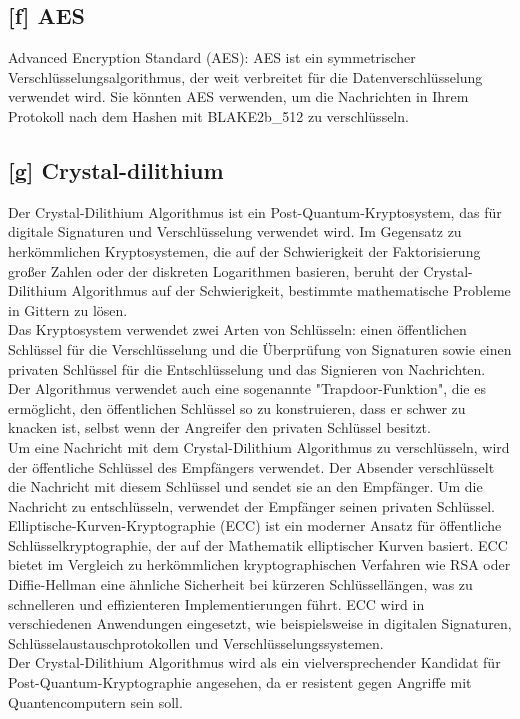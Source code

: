 \subsection*{[f] AES}
\label{glo:aes}
Advanced Encryption Standard (AES): AES ist ein symmetrischer Verschlüsselungsalgorithmus, der weit verbreitet für die Datenverschlüsselung verwendet wird. Sie könnten AES verwenden, um die Nachrichten in Ihrem Protokoll nach dem Hashen mit BLAKE2b\_512 zu verschlüsseln.
\subsection*{[g] Crystal-dilithium}
\label{glo:crystal-dilithium}
Der Crystal-Dilithium \cite{crystal} Algorithmus ist ein Post-Quantum-Kryptosystem, das für digitale Signaturen und Verschlüsselung verwendet wird. Im Gegensatz zu herkömmlichen Kryptosystemen, die auf der Schwierigkeit der Faktorisierung großer Zahlen oder der diskreten Logarithmen basieren, beruht der Crystal-Dilithium Algorithmus auf der Schwierigkeit, bestimmte mathematische Probleme in Gittern zu lösen.\\
Das Kryptosystem verwendet zwei Arten von Schlüsseln: einen öffentlichen Schlüssel für die Verschlüsselung und die Überprüfung von Signaturen sowie einen privaten Schlüssel für die Entschlüsselung und das Signieren von Nachrichten. Der Algorithmus verwendet auch eine sogenannte "Trapdoor-Funktion", die es ermöglicht, den öffentlichen Schlüssel so zu konstruieren, dass er schwer zu knacken ist, selbst wenn der Angreifer den privaten Schlüssel besitzt.\\
Um eine Nachricht mit dem Crystal-Dilithium Algorithmus zu verschlüsseln, wird der öffentliche Schlüssel des Empfängers verwendet. Der Absender verschlüsselt die Nachricht mit diesem Schlüssel und sendet sie an den Empfänger. Um die Nachricht zu entschlüsseln, verwendet der Empfänger seinen privaten Schlüssel.\\
Elliptische-Kurven-Kryptographie (ECC) ist ein moderner Ansatz für öffentliche Schlüsselkryptographie, der auf der Mathematik elliptischer Kurven basiert. ECC bietet im Vergleich zu herkömmlichen kryptographischen Verfahren wie RSA oder Diffie-Hellman eine ähnliche Sicherheit bei kürzeren Schlüssellängen, was zu schnelleren und effizienteren Implementierungen führt. ECC wird in verschiedenen Anwendungen eingesetzt, wie beispielsweise in digitalen Signaturen, Schlüsselaustauschprotokollen und Verschlüsselungssystemen.\\
Der Crystal-Dilithium Algorithmus wird als ein vielversprechender Kandidat für Post-Quantum-Kryptographie angesehen, da er resistent gegen Angriffe mit Quantencomputern sein soll.\cite{poepelmann2018crystal}\cite{10.1145/3319535}
